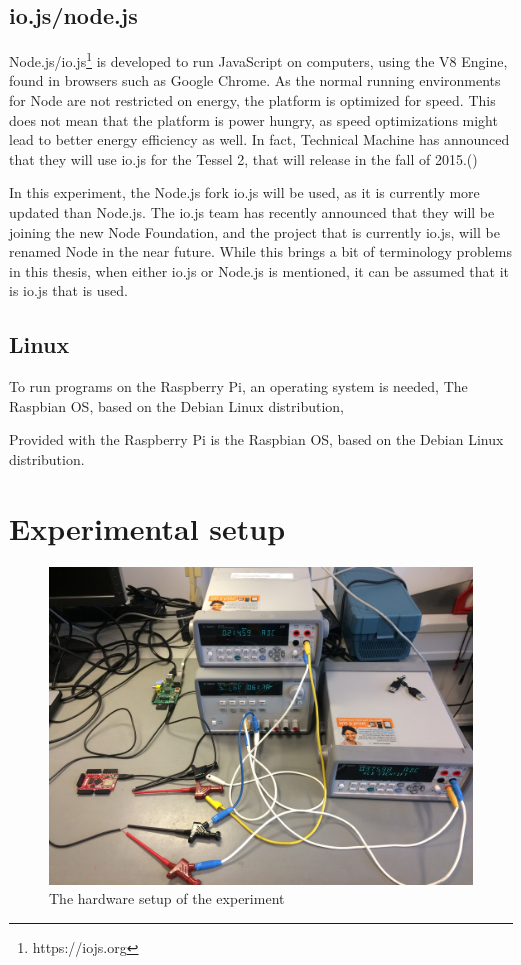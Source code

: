 \subsection{io.js/node.js}
Node.js/io.js\footnote{https://iojs.org} is developed to run JavaScript on computers, using the V8 Engine, found in browsers such as Google Chrome.
As the normal running environments for Node are not restricted on energy, the platform is optimized for speed.
This does not mean that the platform is power hungry, as speed optimizations might lead to better energy efficiency as well.
In fact, Technical Machine has announced that they will use io.js for the Tessel 2, that will release in the fall of 2015.(\cite{movingfaster})

In this experiment, the Node.js fork io.js will be used, as it is currently more updated than Node.js.
The io.js team has recently announced that they will be joining the new Node Foundation, and the project that is currently io.js, will be renamed Node in the near future.
While this brings a bit of terminology problems in this thesis, when either io.js or Node.js is mentioned, it can be assumed that it is io.js that is used.


\subsection{Linux}
To run programs on the Raspberry Pi, an operating system is needed, 
The Raspbian OS, based on the Debian Linux distribution, 

Provided with the Raspberry Pi is the Raspbian OS, based on the Debian Linux distribution.





\section{Experimental setup}

\begin{figure}[ht]
\centering
\includegraphics[width=\textwidth]{fig/pics/setup.jpg}
\caption{The hardware setup of the experiment}
\label{fig:setup}
\end{figure}

